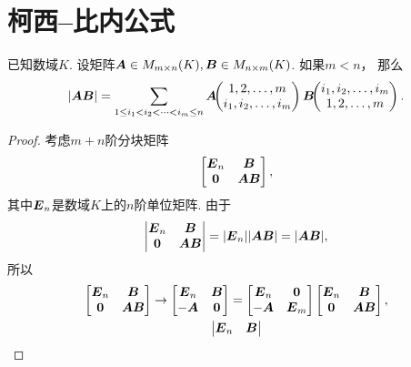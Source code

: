 \section{柯西--比内公式}
\begin{theorem}
已知数域\(K\).
设矩阵\(\boldsymbol{A} \in M_{m \times n}(K),
\boldsymbol{B} \in M_{n \times m}(K)\).
如果\(m < n\)，
那么\begin{equation}\label{equation:线性方程组.柯西比内公式}
	\abs{\boldsymbol{A}\boldsymbol{B}}
	= \sum_{1 \leq i_1 < i_2 < \dotsb < i_m \leq n}
	\boldsymbol{A}\kern-3.8pt\begin{pmatrix}
		1,2,\dotsc,m \\
		i_1,i_2,\dotsc,i_m
	\end{pmatrix}
	\boldsymbol{B}\kern-3.8pt\begin{pmatrix}
		i_1,i_2,\dotsc,i_m \\
		1,2,\dotsc,m
	\end{pmatrix}.
\end{equation}
\begin{proof}
考虑\(m+n\)阶分块矩阵\begin{equation*}
	\begin{bmatrix}
		\boldsymbol{E}_n & \boldsymbol{B} \\
		\boldsymbol0 & \boldsymbol{A}\boldsymbol{B}
	\end{bmatrix},
\end{equation*}
其中\(\boldsymbol{E}_n\)是数域\(K\)上的\(n\)阶单位矩阵.
由于\begin{equation*}
	\begin{vmatrix}
		\boldsymbol{E}_n & \boldsymbol{B} \\
		\boldsymbol0 & \boldsymbol{A}\boldsymbol{B}
	\end{vmatrix}
	= \abs{\boldsymbol{E}_n} \abs{\boldsymbol{A}\boldsymbol{B}}
	= \abs{\boldsymbol{A}\boldsymbol{B}},
\end{equation*}
所以\begin{gather*}
	\begin{bmatrix}
		\boldsymbol{E}_n & \boldsymbol{B} \\
		\boldsymbol0 & \boldsymbol{A}\boldsymbol{B}
	\end{bmatrix}
	\to
	\begin{bmatrix}
		\boldsymbol{E}_n & \boldsymbol{B} \\
		-\boldsymbol{A} & \boldsymbol0
	\end{bmatrix}
	= \begin{bmatrix}
		\boldsymbol{E}_n & \boldsymbol0 \\
		-\boldsymbol{A} & \boldsymbol{E}_m
	\end{bmatrix} \begin{bmatrix}
		\boldsymbol{E}_n & \boldsymbol{B} \\
		\boldsymbol0 & \boldsymbol{A}\boldsymbol{B}
	\end{bmatrix}, \\
	\begin{vmatrix}
		\boldsymbol{E}_n & \boldsymbol{B} \\

\end{vmatrix}
\end{gather*}
\end{proof}
\end{theorem}
